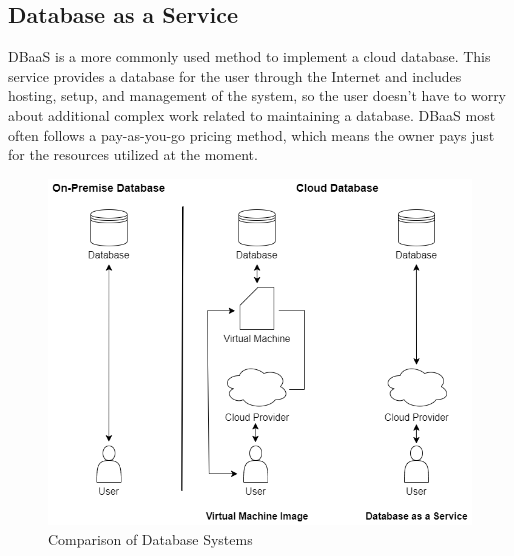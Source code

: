 \documentclass[12pt, a4paper]{article}
\begin{document}
    \subsection{Database as a Service}
        DBaaS is a more commonly used method to implement a cloud database. This service provides a database for the user through the Internet and includes hosting, setup, and management of the system, so the user doesn't have to worry about additional complex work related to maintaining a database. DBaaS most often follows a pay-as-you-go pricing method, which means the owner pays just for the resources utilized at the moment.
        \begin{figure}[t]
            \centering
            \includegraphics[width=1\linewidth]{images/onpremise-cloud.png}
            \caption{Comparison of Database Systems}
            \label{fig:comparison}
        \end{figure}
    \clearpage
        
    
\section*{}
\clearpage


\end{document}
